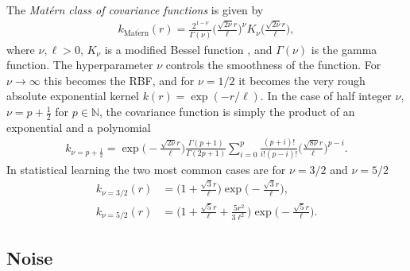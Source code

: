 \documentclass[twoside,english]{uiofysmaster}
\begin{document}
{{The \textit{Mat\'{e}rn class of covariance functions} is given by
\begin{align}\label{Eq:: gaussian process : Matern class of covariance functions}
k_{\mathrm{Mat\acute{e}rn}} (r) = \frac{2^{1- \nu}}{\Gamma (\nu)} \Big( \frac{\sqrt{2 \nu} r	}{\ell} \Big)^{\nu} K_{\nu} \Big( \frac{\sqrt{2 \nu}r}{\ell} \Big),
\end{align}
where $\nu, \ell > 0$, $K_{\nu}$ is a modified Bessel function \cite{abramowitz1964handbook}, and $\Gamma(\nu)$ is the gamma function. The hyperparameter $\nu$ controls the smoothness of the function. For $\nu \rightarrow \infty$ this becomes the RBF, and for $\nu = 1/2$ it becomes the very rough absolute exponential kernel $k(r)= \exp (-r/\ell)$. In the case of half integer $\nu$, $\nu = p + \frac{1}{2}$ for $p \in \mathbb{N}$, the covariance function is simply the product of an exponential and a polynomial
\begin{align}
k_{\nu=p+\frac{1}{2}} = \exp \Big(- \frac{\sqrt{2 \nu} r	}{\ell} \Big) \frac{\Gamma(p+1)}{\Gamma(2p + 1)} \sum^p_{i=0} \frac{(p+i)!}{i!(p-i)!} \Big( \frac{\sqrt{8 \nu} r	}{\ell} \Big)^{p-i}.
\end{align}
In statistical learning the two most common cases are for $\nu = 3/2$ and $\nu = 5/2$
\begin{align}
k_{\nu = 3/2}(r) &=  \Big(1 + \frac{\sqrt{3}r}{\ell} \Big) \exp \Big( -\frac{\sqrt{3}r}{\ell} \Big),\\
k_{\nu = 5/2}(r) &=  \Big(1 + \frac{\sqrt{5}r}{\ell}  + \frac{5r^2}{3 \ell^2}\Big) \exp \Big( -\frac{\sqrt{5}r}{\ell} \Big).
\end{align}



\subsection{Noise}\label{Sec:: gaussian process : Noise Covariance Function}


}}
\end{document}
